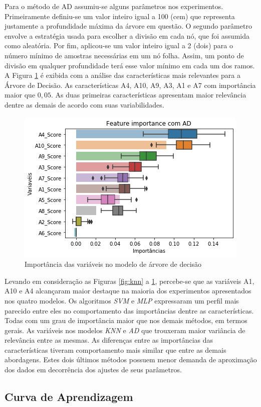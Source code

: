 \documentclass{template/sig-alternate-05-2015}
\begin{document}
    Para o método de AD assumiu-se alguns parâmetros nos
    experimentos. Primeiramente definiu-se um valor inteiro igual a
    100 (cem) que representa justamente a profundidade máxima da
    árvore em questão. O segundo parâmetro envolve a estratégia usada
    para escolher a divisão em cada nó, que foi assumida como
    aleatória. Por fim, aplicou-se um valor inteiro igual a 2 (dois)
    para o número mínimo de amostras necessárias em um nó
    folha. Assim, um ponto de divisão em qualquer profundidade terá
    esse valor mínimo em cada um dos ramos. A Figura \ref{fig:ad} é
    exibida com a análise das características mais relevantes para a
    Árvore de Decisão. As características A4, A10, A9, A3, A1 e A7 com
    importância maior que $0,05$. As duas primeiras características
    apresentam maior relevância dentre as demais de acordo com suas
    variabilidades.

    \begin{figure}[!h]
      \centering
      \includegraphics[width=.5\textwidth]{imagens/box_ad.png}
      \caption{Importância das variáveis no modelo de árvore de
        decisão}
      \label{fig:ad}
    \end{figure}

    Levando em consideração as Figuras \ref{fig:knn} a \ref{fig:ad},
    percebe-se que as variáveis A1, A10 e A4 alcançaram maior destaque
    na maioria dos experimentos apresentados nos quatro modelos. Os
    algoritmos \emph{SVM} e \emph{MLP} expressaram um perfil mais
    parecido entre eles no comportamento das importâncias dentre as
    características. Todas com um grau de importância maior que nos
    demais métodos, em termos gerais. As variáveis nos modelos
    \emph{KNN} e \emph{AD} que trouxeram maior variância de relevância
    entre as mesmas. As diferenças entre as importâncias das
    características tiveram comportamento mais similar que entre as
    demais abordagens. Estes dois últimos métodos possuem menor
    demanda de aproximação dos dados em decorrência dos ajustes de
    seus parâmetros.

    \subsection{Curva de Aprendizagem}
\end{document}
